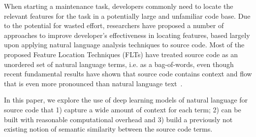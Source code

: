 
% 
%
When starting a maintenance task, developers commonly need to locate
the relevant features for the task in a potentially large and
unfamiliar code base. Due to the potential for wasted effort,
researchers have proposed a number of approaches to improve
developer's effectiveness in locating features, based largely upon
applying natural language analysis techniques to source code. Most of
the proposed Feature Location Techniques (FLTs) have treated source
code as an unordered set of natural language terms, i.e. as a
bag-of-words, even though recent fundamental results have shown that
source code contains context and flow that is even more pronounced
than natural language text~\cite{naturalness}. 



%
%
In this paper, we explore the use of deep learning models of natural
language for source code that 1) capture a wide amount of context for
each term; 2) can be built with reasonable computational overhead and
3) build a previously not existing notion of semantic similarity
between the source code terms.



